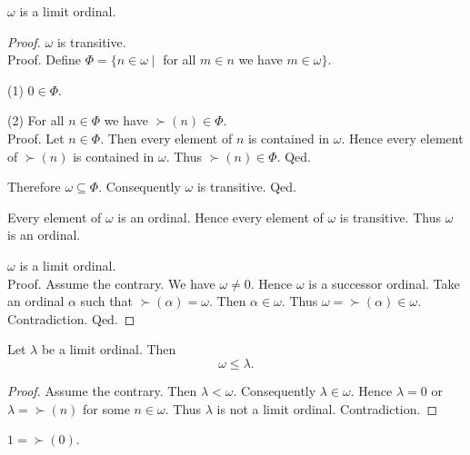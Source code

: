 \documentclass[../../set-theory/set-theory.tex]{subfiles}
\begin{document}
  \begin{forthel}
    \begin{proposition}
      $\omega$ is a limit ordinal.
    \end{proposition}
    \begin{proof}
      $\omega$ is transitive. \\
      Proof.
        Define $\Phi = \{ n \in \omega \mid$ for all $m \in n$ we have
        $m \in \omega \}$.

        (1) $0 \in \Phi$.

        (2) For all $n \in \Phi$ we have $\succ(n) \in \Phi$. \\
        Proof.
          Let $n \in \Phi$.
          Then every element of $n$ is contained in $\omega$.
          Hence every element of $\succ(n)$ is contained in $\omega$.
          Thus $\succ(n) \in \Phi$.
        Qed.

        Therefore $\omega \subseteq \Phi$.
        Consequently $\omega$ is transitive.
      Qed.

      Every element of $\omega$ is an ordinal.
      Hence every element of $\omega$ is transitive.
      Thus $\omega$ is an ordinal.

      $\omega$ is a limit ordinal. \\
      Proof.
        Assume the contrary.
        We have $\omega \neq 0$.
        Hence $\omega$ is a successor ordinal.
        Take an ordinal $\alpha$ such that $\succ(\alpha) = \omega$.
        Then $\alpha \in \omega$.
        Thus $\omega = \succ(\alpha) \in \omega$.
        Contradiction.
      Qed.
    \end{proof}
  \end{forthel}

  \begin{forthel}
    \begin{proposition}
      Let $\lambda$ be a limit ordinal.
      Then \[ \omega \leq \lambda. \]
    \end{proposition}
    \begin{proof}
      Assume the contrary.
      Then $\lambda < \omega$.
      Consequently $\lambda \in \omega$.
      Hence $\lambda = 0$ or $\lambda = \succ(n)$ for some $n \in \omega$.
      Thus $\lambda$ is not a limit ordinal.
      Contradiction.
    \end{proof}
  \end{forthel}

  \begin{forthel}
    \begin{definition}
      $1 = \succ(0)$.
    \end{definition}
  \end{forthel}
\end{document}
